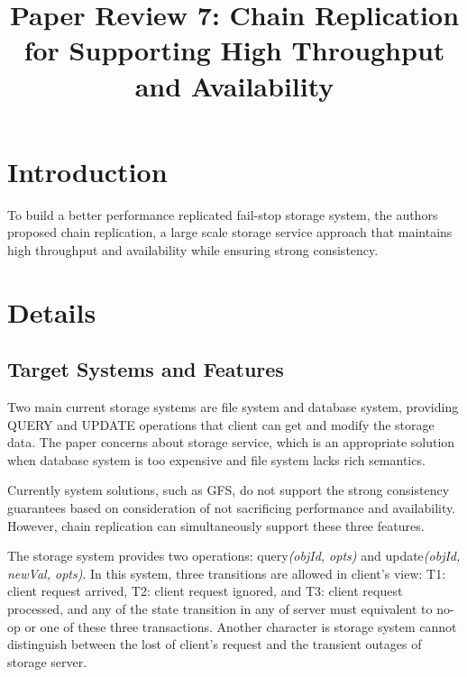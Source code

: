 \documentclass[conference]{IEEEtran}
\begin{document}
\title{Paper Review 7: Chain Replication for Supporting
High Throughput and Availability\\
}

\author{
}

\maketitle

\section{Introduction}
To build a better performance replicated fail-stop storage system, the authors proposed chain replication, a large scale storage service approach that maintains high throughput and availability while ensuring strong consistency.

\section{Details}
\subsection{Target Systems and Features}
Two main current storage systems are file system and database system, providing QUERY and UPDATE operations that client can get and modify the storage data. The paper concerns about storage service, which is an appropriate solution when database system is too expensive and file system lacks rich semantics.

Currently system solutions, such as GFS, do not support the strong consistency guarantees based on consideration of not sacrificing performance and availability. However, chain replication can simultaneously support these three features.

The storage system provides two operations: query\textit{(objId, opts)} and update\textit{(objId, newVal, opts)}. In this system, three transitions are allowed in client's view: T1: client request arrived, T2: client request ignored, and T3: client request processed, and any of the state transition in any of server must equivalent to no-op or one of these three transactions. Another character is storage system cannot distinguish between the lost of client's request and the transient outages of storage server.
\end{document}
